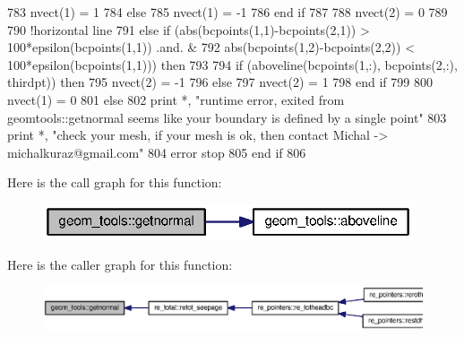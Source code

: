 \begin{DoxyCode}
783          nvect(1) = 1
784        \textcolor{keywordflow}{else}
785          nvect(1) = -1
786 \textcolor{keywordflow}{       end if}
787        
788        nvect(2) = 0
789        
790      \textcolor{comment}{!horizontal line}
791     \textcolor{keywordflow}{else} \textcolor{keywordflow}{if} (abs(bcpoints(1,1)-bcpoints(2,1)) > 100*epsilon(bcpoints(1,1)) .and. &
792        abs(bcpoints(1,2)-bcpoints(2,2)) < 100*epsilon(bcpoints(1,1))) \textcolor{keywordflow}{then}
793        
794        \textcolor{keywordflow}{if} (aboveline(bcpoints(1,:), bcpoints(2,:), thirdpt)) \textcolor{keywordflow}{then}
795          nvect(2) = -1
796        \textcolor{keywordflow}{else}
797          nvect(2) = 1
798 \textcolor{keywordflow}{       end if}
799        
800        nvect(1) = 0
801      \textcolor{keywordflow}{else}
802        print *, \textcolor{stringliteral}{"runtime error, exited from geomtools::getnormal seems like your boundary is defined by a
       single point"}
803        print *, \textcolor{stringliteral}{"check your mesh, if your mesh is ok, then contact Michal -> michalkuraz@gmail.com"}
804        error stop
805 \textcolor{keywordflow}{     end if}
806   
\end{DoxyCode}


Here is the call graph for this function\+:\nopagebreak
\begin{figure}[H]
\begin{center}
\leavevmode
\includegraphics[width=310pt]{namespacegeom__tools_a9a7f232fec395ff22f8985cffeebd146_cgraph}
\end{center}
\end{figure}




Here is the caller graph for this function\+:\nopagebreak
\begin{figure}[H]
\begin{center}
\leavevmode
\includegraphics[width=350pt]{namespacegeom__tools_a9a7f232fec395ff22f8985cffeebd146_icgraph}
\end{center}
\end{figure}


